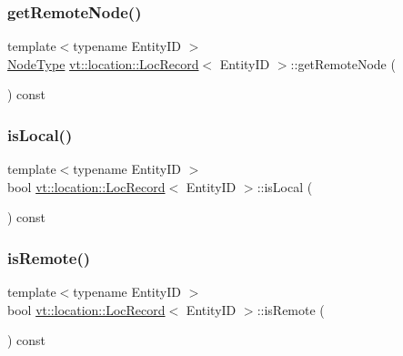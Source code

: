 \subsubsection{\texorpdfstring{get\+Remote\+Node()}{getRemoteNode()}}
{\footnotesize\ttfamily template$<$typename Entity\+ID $>$ \\
\hyperlink{namespacevt_a866da9d0efc19c0a1ce79e9e492f47e2}{Node\+Type} \hyperlink{structvt_1_1location_1_1_loc_record}{vt\+::location\+::\+Loc\+Record}$<$ Entity\+ID $>$\+::get\+Remote\+Node (\begin{DoxyParamCaption}{ }\end{DoxyParamCaption}) const}

\mbox{\label{structvt_1_1location_1_1_loc_record_af3bb2160b4ad36664ef47171cf6d58a4}} 
\subsubsection{\texorpdfstring{is\+Local()}{isLocal()}}
{\footnotesize\ttfamily template$<$typename Entity\+ID $>$ \\
bool \hyperlink{structvt_1_1location_1_1_loc_record}{vt\+::location\+::\+Loc\+Record}$<$ Entity\+ID $>$\+::is\+Local (\begin{DoxyParamCaption}{ }\end{DoxyParamCaption}) const}

\mbox{\label{structvt_1_1location_1_1_loc_record_a891b73a9c0092f6b022514309190cc8e}} 
\subsubsection{\texorpdfstring{is\+Remote()}{isRemote()}}
{\footnotesize\ttfamily template$<$typename Entity\+ID $>$ \\
bool \hyperlink{structvt_1_1location_1_1_loc_record}{vt\+::location\+::\+Loc\+Record}$<$ Entity\+ID $>$\+::is\+Remote (\begin{DoxyParamCaption}{ }\end{DoxyParamCaption}) const}

